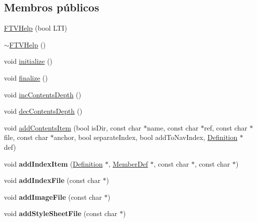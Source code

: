 \subsection*{Membros públicos}
\begin{DoxyCompactItemize}
\item 
\hyperlink{class_f_t_v_help_a7b01144f49143ee8b8948bf4ee92b8db}{F\-T\-V\-Help} (bool L\-T\-I)
\item 
\hyperlink{class_f_t_v_help_a8e25384e4ec0e139e08b0c8656526692}{$\sim$\-F\-T\-V\-Help} ()
\item 
void \hyperlink{class_f_t_v_help_a25a40b6614565f755233080a384c35f1}{initialize} ()
\item 
void \hyperlink{class_f_t_v_help_a32d626626eee0bc4ade146973f6abb1c}{finalize} ()
\item 
void \hyperlink{class_f_t_v_help_a96772b5eeae8044b3308f63fb040c253}{inc\-Contents\-Depth} ()
\item 
void \hyperlink{class_f_t_v_help_a3a6a2629dd91105d0048f0d0a9f7f983}{dec\-Contents\-Depth} ()
\item 
void \hyperlink{class_f_t_v_help_a2037325cd2bf36b4a134b87dbb107a94}{add\-Contents\-Item} (bool is\-Dir, const char $\ast$name, const char $\ast$ref, const char $\ast$file, const char $\ast$anchor, bool separate\-Index, bool add\-To\-Nav\-Index, \hyperlink{class_definition}{Definition} $\ast$def)
\item 
\hypertarget{class_f_t_v_help_a835bbbbea9382c2a4e0c149f08711736}{void {\bfseries add\-Index\-Item} (\hyperlink{class_definition}{Definition} $\ast$, \hyperlink{class_member_def}{Member\-Def} $\ast$, const char $\ast$, const char $\ast$)}\label{class_f_t_v_help_a835bbbbea9382c2a4e0c149f08711736}

\item 
\hypertarget{class_f_t_v_help_a48a737bbb7a16b67c9ccbaf9e6cb0fe8}{void {\bfseries add\-Index\-File} (const char $\ast$)}\label{class_f_t_v_help_a48a737bbb7a16b67c9ccbaf9e6cb0fe8}

\item 
\hypertarget{class_f_t_v_help_ae96a05963365ea76e95ac32a7cce3fb2}{void {\bfseries add\-Image\-File} (const char $\ast$)}\label{class_f_t_v_help_ae96a05963365ea76e95ac32a7cce3fb2}

\item 
\hypertarget{class_f_t_v_help_a373a41a11f6707488992a715912f6f06}{void {\bfseries add\-Style\-Sheet\-File} (const char $\ast$)}\label{class_f_t_v_help_a373a41a11f6707488992a715912f6f06}


\end{DoxyCompactItemize}
